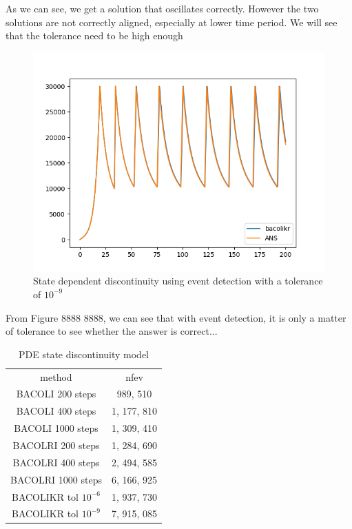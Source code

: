 \documentclass{article}
\begin{document}
As we can see, we get a solution that oscillates correctly. However the two solutions are not correctly aligned, especially at lower time period. We will see that the tolerance need to be high enough

\begin{figure}[H]
\centering
\includegraphics[width=0.7\linewidth]{./figures/pde_state_disc_event_tol_9}
\caption{State dependent discontinuity using event detection with a tolerance of $10^{-9}$}
\label{fig:pde_state_disc_event_tol_9}
\end{figure}

From Figure 8888 8888, we can see that with event detection, it is only a matter of tolerance to see whether the answer is correct...

\begin{table}[h]
\caption {PDE state discontinuity model} 
\label{tab:pde_state_nfev}
\begin{center}
\begin{tabular}{ c c } 
method                  & nfev \\ 
BACOLI 200 steps        &  989, 510    \\
BACOLI 400 steps        & 1, 177, 810    \\
BACOLI 1000 steps       & 1, 309, 410    \\
BACOLRI 200 steps       & 1, 284, 690    \\
BACOLRI 400 steps       & 2, 494, 585   \\
BACOLRI 1000 steps      & 6, 166, 925    \\
BACOLIKR tol $10^{-6}$  & 1, 937, 730    \\
BACOLIKR tol $10^{-9}$  & 7, 915, 085    \\
\end{tabular}
\end{center}
\end{table} 
\end{document}

